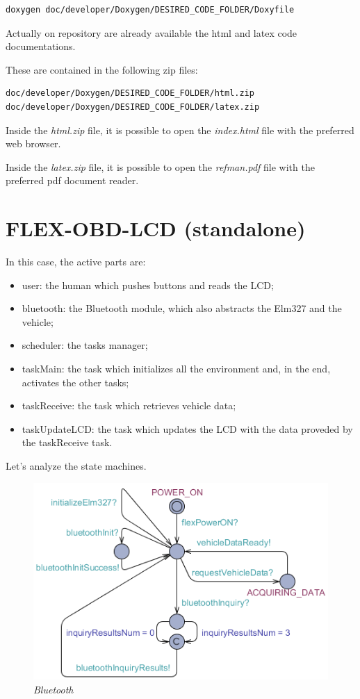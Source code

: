 \documentclass[paper=a4, fontsize=11pt]{scrartcl} %
\numberwithin{equation}{section} %
\numberwithin{figure}{section} %
\numberwithin{table}{section} %
\begin{document}
\begin{lstlisting}[language=bash]
doxygen doc/developer/Doxygen/DESIRED_CODE_FOLDER/Doxyfile
\end{lstlisting}

Actually on repository are already available the html and latex code documentations.

These are contained in the following zip files:

\begin{lstlisting}[language=bash]
doc/developer/Doxygen/DESIRED_CODE_FOLDER/html.zip
doc/developer/Doxygen/DESIRED_CODE_FOLDER/latex.zip
\end{lstlisting}

Inside the \emph{html.zip} file, it is possible to open the \emph{index.html} file with the preferred web browser.

Inside the \emph{latex.zip} file, it is possible to open the \emph{refman.pdf} file with the preferred pdf document reader.

\section{FLEX-OBD-LCD (standalone)}

In this case, the active parts are:

\begin{itemize}
	\item user: the human which pushes buttons and reads the LCD;
	\item bluetooth: the Bluetooth module, which also abstracts the Elm327 and the vehicle;
	\item scheduler: the tasks manager;
	\item taskMain: the task which initializes all the environment and, in the end, activates the other tasks;
	\item taskReceive: the task which retrieves vehicle data;
	\item taskUpdateLCD: the task which updates the LCD with the data proveded by the taskReceive task.
\end{itemize}

Let's analyze the state machines.

\begin{figure}[H]
  \centering
  \includegraphics[width=4.7in]{img/FLEX-OBD-LCD_bluetooth}
  \caption{\textit{Bluetooth}}
\end{figure}
\end{document}
